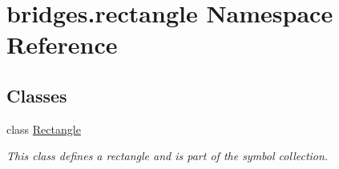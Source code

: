 \hypertarget{namespacebridges_1_1rectangle}{}\section{bridges.\+rectangle Namespace Reference}
\label{namespacebridges_1_1rectangle}
\subsection*{Classes}
\begin{DoxyCompactItemize}
\item 
class \mbox{\hyperlink{classbridges_1_1rectangle_1_1_rectangle}{Rectangle}}
\begin{DoxyCompactList}\small\item\em This class defines a rectangle and is part of the symbol collection. \end{DoxyCompactList}\end{DoxyCompactItemize}
